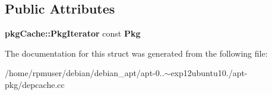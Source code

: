 \subsection*{\-Public \-Attributes}
\begin{DoxyCompactItemize}
\item 
{\bf pkg\-Cache\-::\-Pkg\-Iterator} const {\bfseries \-Pkg}\label{structCompareProviders_ab7ab4f9c732915ff2f790b32697427bc}

\end{DoxyCompactItemize}


\-The documentation for this struct was generated from the following file\-:\begin{DoxyCompactItemize}
\item 
/home/rpmuser/debian/debian\-\_\-apt/apt-\/0..$\sim$exp12ubuntu10./apt-\/pkg/depcache.\-cc\end{DoxyCompactItemize}
